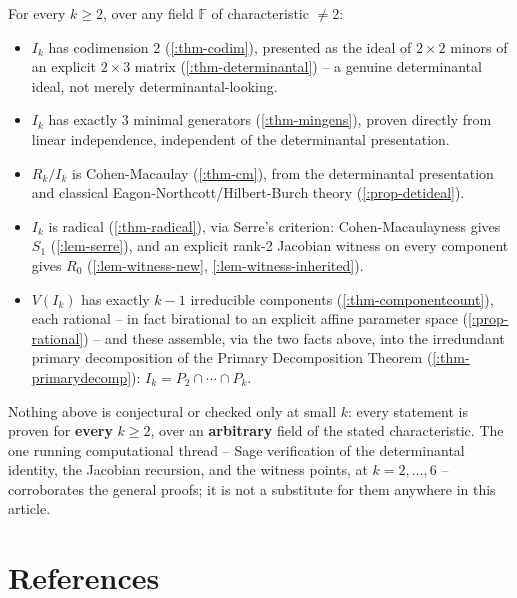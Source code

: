 \documentclass[a4paper,11pt]{scrartcl}
\begin{document}
For every \(k \geq 2\), over any field \(\mathbb{F}\) of characteristic \(\neq 2\):

\begin{itemize}
\item
  \(I_{k}\) has codimension 2 (\cref{:thm-codim}), presented as the ideal of \(2 \times 2\) minors of an explicit \(2 \times 3\) matrix (\cref{:thm-determinantal}) -- a genuine determinantal ideal, not merely determinantal-looking.
\item
  \(I_{k}\) has exactly 3 minimal generators (\cref{:thm-mingens}), proven directly from linear independence, independent of the determinantal presentation.
\item
  \(R_{k}/I_{k}\) is Cohen-Macaulay (\cref{:thm-cm}), from the determinantal presentation and classical Eagon-Northcott/Hilbert-Burch theory (\cref{:prop-detideal}).
\item
  \(I_{k}\) is radical (\cref{:thm-radical}), via Serre's criterion: Cohen-Macaulayness gives \(S_{1}\) (\cref{:lem-serre}), and an explicit rank-2 Jacobian witness on every component gives \(R_{0}\) (\cref{:lem-witness-new}, \cref{:lem-witness-inherited}).
\item
  \(V\left( I_{k} \right)\) has exactly \(k - 1\) irreducible components (\cref{:thm-componentcount}), each rational -- in fact birational to an explicit affine parameter space (\cref{:prop-rational}) -- and these assemble, via the two facts above, into the irredundant primary decomposition of the Primary Decomposition Theorem (\cref{:thm-primarydecomp}): \(I_{k} = P_{2} \cap \cdots \cap P_{k}\).
\end{itemize}

Nothing above is conjectural or checked only at small \(k\): every statement is proven for \textbf{every} \(k \geq 2\), over an \textbf{arbitrary} field of the stated characteristic. The one running computational thread -- Sage verification of the determinantal identity, the Jacobian recursion, and the witness points, at \(k = 2,\ldots,6\) -- corroborates the general proofs; it is not a substitute for them anywhere in this article.

\section{References}
\end{document}
